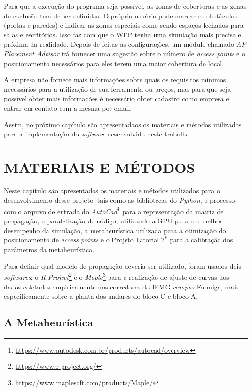 \documentclass[
	12pt,				%
	twoside,			%
	a4paper,			%
	english,			%
	french,				%
	spanish,			%
	brazil				%
	]{abntex2}
\begin{document}
Para que a execução do programa seja possível, as zonas de coberturas e
as zonas de exclusão tem de ser definidas. O próprio usuário pode marcar
os obstáculos (portas e paredes) e indicar as zonas especiais como sendo
espaços fechados para salas e escritórios. Isso faz com que o WFP tenha
uma simulação mais precisa e próxima da realidade. Depois de feitas as
configurações, um módulo chamado \emph{AP Placement Advisor} irá
fornecer uma sugestão sobre o número de \emph{access points} e o
posicionamento necessários para eles terem uma maior cobertura do local.

A empresa não fornece mais informações sobre quais os requisitos mínimos
necessários para a utilização de sua ferramenta ou preços, mas para que
seja possível obter mais informações é necessário obter cadastro como
empresa e entrar em contato com a mesma por email.

Assim, no próximo capítulo são apresentadaos os materiais e métodos
utilizados para a implementação do \emph{software} desenvolvido neste
trabalho.

\chapter{MATERIAIS E MÉTODOS}\label{sec:materiais}

Neste capítulo são apresentados os materiais e métodos utilizados para o
desenvolvimento desse projeto, tais como as bibliotecas do
\emph{Python}, o processo com o arquivo de entrada do
\emph{AutoCad}\footnote{\url{https://www.autodesk.com.br/products/autocad/overview}}
para a representação da matriz de propagação, a paralelização do código,
utilizando a GPU para um melhor desempenho da simulação, a
metaheurística utilizada para a otimização do posicionamento de
\emph{access points} e o Projeto Fatorial \(2^{k}\) para a calibração
dos parâmetros da metaheurística.

Para definir qual modelo de propagação deveria ser utilizado, foram
usados dois \emph{softwares}: o \emph{R-Project}\footnote{\url{https://www.r-project.org/}}
e o \emph{Maple}\footnote{\url{https://www.maplesoft.com/products/Maple/}}
para a realização de ajuste de curvas dos dados coletados empiricamente
nos corredores do IFMG \emph{campus} Formiga, mais especificamente sobre
a planta dos andares do bloco C e bloco A.

\section{A Metaheurística}\label{a-metaheuruxedstica}
\end{document}
